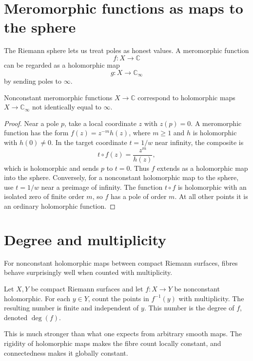 \section{Meromorphic functions as maps to the sphere}

The Riemann sphere lets us treat poles as honest values.  A meromorphic function
\[
  f:X\to\mathbb C
\]
can be regarded as a holomorphic map
\[
  g:X\to\mathbb C_\infty
\]
by sending poles to \(\infty\).

\begin{proposition}
Nonconstant meromorphic functions \(X\to\mathbb C\) correspond to holomorphic maps \(X\to\mathbb C_\infty\) not identically equal to \(\infty\).
\end{proposition}

\begin{proof}
Near a pole \(p\), take a local coordinate \(z\) with \(z(p)=0\). A meromorphic function has the form \(f(z)=z^{-m}h(z)\), where \(m\ge1\) and \(h\) is holomorphic with \(h(0)\ne0\). In the target coordinate \(t=1/w\) near infinity, the composite is
\[
 t\circ f(z)=\frac{z^m}{h(z)},
\]
which is holomorphic and sends \(p\) to \(t=0\). Thus \(f\) extends as a holomorphic map into the sphere. Conversely, for a nonconstant holomorphic map to the sphere, use \(t=1/w\) near a preimage of infinity. The function \(t\circ f\) is holomorphic with an isolated zero of finite order \(m\), so \(f\) has a pole of order \(m\). At all other points it is an ordinary holomorphic function.
\end{proof}

\section{Degree and multiplicity}

For nonconstant holomorphic maps between compact Riemann surfaces, fibres behave surprisingly well when counted with multiplicity.

\begin{proposition}
Let \(X,Y\) be compact Riemann surfaces and let \(f:X\to Y\) be nonconstant holomorphic.  For each \(y\in Y\), count the points in \(f^{-1}(y)\) with multiplicity.  The resulting number is finite and independent of \(y\).  This number is the degree of \(f\), denoted \(\deg(f)\).
\end{proposition}

\begin{remark}
This is much stronger than what one expects from arbitrary smooth maps.  The rigidity of holomorphic maps makes the fibre count locally constant, and connectedness makes it globally constant.
\end{remark}

